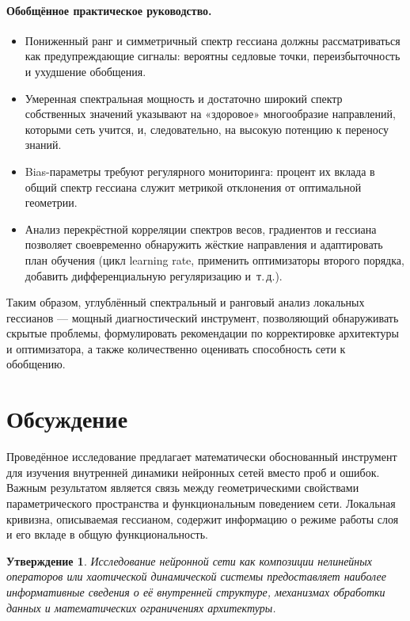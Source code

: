\documentclass[a4paper,12pt]{article}
\newtheorem{proposition}{Утверждение}
\begin{document}
\paragraph{Обобщённое практическое руководство.}
\begin{itemize}
  \item Пониженный ранг и симметричный спектр гессиана должны рассматриваться как предупреждающие сигналы:
    вероятны седловые точки, переизбыточность и ухудшение обобщения.
  \item Умеренная спектральная мощность и достаточно широкий спектр собственных значений указывают на
    «здоровое» многообразие направлений, которыми сеть учится, и, следовательно, на высокую потенцию к переносу знаний.
  \item Bias-параметры требуют регулярного мониторинга: процент их вклада в общий спектр гессиана служит
    метрикой отклонения от оптимальной геометрии.
  \item Анализ перекрёстной корреляции спектров весов, градиентов и гессиана позволяет своевременно
    обнаружить жёсткие направления и адаптировать план обучения (цикл learning rate, применить оптимизаторы
    второго порядка, добавить дифференциальную регуляризацию и~т.\,д.).
\end{itemize}

Таким образом, углублённый спектральный и ранговый анализ локальных гессианов — мощный диагностический
инструмент, позволяющий обнаруживать скрытые проблемы, формулировать рекомендации по корректировке
архитектуры и оптимизатора, а также количественно оценивать способность сети к обобщению.

\section{Обсуждение}
Проведённое исследование предлагает математически обоснованный инструмент для изучения внутренней динамики
нейронных сетей вместо проб и ошибок. Важным результатом является связь между геометрическими свойствами
параметрического пространства и функциональным поведением сети. Локальная кривизна, описываемая гессианом,
содержит информацию о режиме работы слоя и его вкладе в общую функциональность.

\begin{proposition}
  Исследование нейронной сети как композиции нелинейных операторов или хаотической динамической системы
  предоставляет наиболее информативные сведения о её внутренней структуре, механизмах обработки данных и
  математических ограничениях архитектуры.
\end{proposition}
\end{document}
